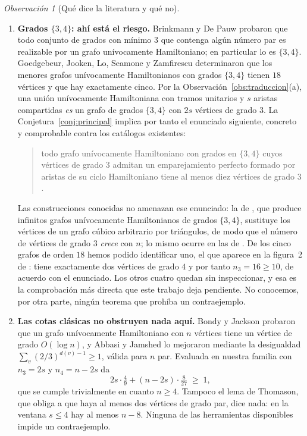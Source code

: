 \documentclass[11pt,a4paper]{article}
\theoremstyle{definition}
\theoremstyle{remark}
\newtheorem{observacion}[teorema]{Observación}
\begin{document}
\begin{observacion}[Qué dice la literatura y qué no]
\begin{enumerate}[label=(\arabic*)]
\item \textbf{Grados $\{3,4\}$: ahí está el riesgo.} Brinkmann y De Pauw \cite{bdp24} probaron que todo conjunto de grados con mínimo $3$ que contenga algún número par es realizable por un grafo unívocamente Hamiltoniano; en particular lo es $\{3,4\}$. Goedgebeur, Jooken, Lo, Seamone y Zamfirescu \cite{gjlsz} determinaron que los menores grafos unívocamente Hamiltonianos con grados $\{3,4\}$ tienen $18$ vértices y que hay exactamente cinco. Por la Observación~\ref{obs:traduccion}(a), una unión unívocamente Hamiltoniana con tramos unitarios y $s$ aristas compartidas \emph{es} un grafo de grados $\{3,4\}$ con $2s$ vértices de grado $3$. La Conjetura~\ref{conj:principal} implica por tanto el enunciado siguiente, concreto y comprobable contra los catálogos existentes:
\begin{quote}
todo grafo unívocamente Hamiltoniano con grados en $\{3,4\}$ cuyos vértices de grado $3$ admitan un emparejamiento perfecto formado por aristas de su ciclo Hamiltoniano tiene al menos diez vértices de grado $3$.
\end{quote}
Las construcciones conocidas no amenazan ese enunciado: la de \cite{gjlsz}, que produce infinitos grafos unívocamente Hamiltonianos de grados $\{3,4\}$, sustituye los vértices de un grafo cúbico arbitrario por triángulos, de modo que el número de vértices de grado $3$ \emph{crece} con $n$; lo mismo ocurre en las de \cite{bdp24}. De los cinco grafos de orden $18$ hemos podido identificar uno, el que aparece en la figura~2 de \cite{bdp24}: tiene exactamente dos vértices de grado $4$ y por tanto $n_3=16\ge10$, de acuerdo con el enunciado. Los otros cuatro quedan sin inspeccionar, y esa es la comprobación más directa que este trabajo deja pendiente. No conocemos, por otra parte, ningún teorema que prohíba un contraejemplo.

\item \textbf{Las cotas clásicas no obstruyen nada aquí.} Bondy y Jackson \cite{bj98} probaron que un grafo unívocamente Hamiltoniano con $n$ vértices tiene un vértice de grado $O(\log n)$, y Abbasi y Jamshed \cite{aj06} lo mejoraron mediante la desigualdad $\sum_v(2/3)^{d(v)-1}\ge1$, válida para $n$ par. Evaluada en nuestra familia con $n_3=2s$ y $n_4=n-2s$ da
\[
2s\cdot\tfrac49+(n-2s)\cdot\tfrac8{27}\;\ge\;1,
\]
que se cumple trivialmente en cuanto $n\ge4$. Tampoco el lema de Thomason, que obliga a que haya al menos dos vértices de grado par, dice nada: en la ventana $s\le4$ hay al menos $n-8$. Ninguna de las herramientas disponibles impide un contraejemplo.
\end{enumerate}
\end{observacion}
\end{document}
